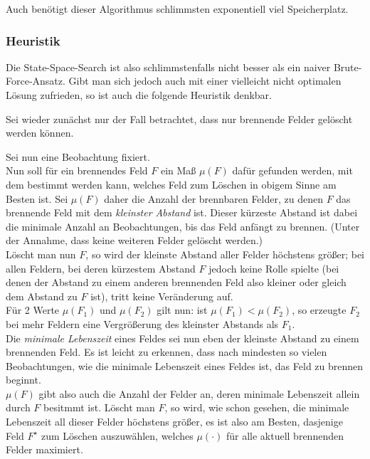Auch benötigt dieser Algorithmus schlimmsten exponentiell viel Speicherplatz.

\subsubsection*{Heuristik}

Die State-Space-Search ist also schlimmstenfalls nicht besser als ein naiver Brute-Force-Ansatz. Gibt man sich jedoch auch mit einer vielleicht nicht optimalen Lösung zufrieden, so ist auch die folgende Heuristik denkbar.

Sei wieder zunächst nur der Fall betrachtet, dass nur brennende Felder gelöscht werden können.

Sei nun eine Beobachtung fixiert.\\
Nun soll für ein brennendes Feld $F$ ein Maß $\mu(F)$ dafür gefunden werden, mit dem bestimmt werden kann, welches Feld zum Löschen in obigem Sinne am Besten ist. Sei $\mu(F)$ daher die Anzahl der brennbaren Felder, zu denen $F$ das brennende Feld mit dem \emph{kleinster Abstand} ist. Dieser kürzeste Abstand ist dabei die minimale Anzahl an Beobachtungen, bis das Feld anfängt zu brennen. (Unter der Annahme, dass keine weiteren Felder gelöscht werden.)\\
Löscht man nun $F$, so wird der kleinste Abstand aller Felder höchstens größer; bei allen Feldern, bei deren kürzestem Abstand $F$ jedoch keine Rolle spielte (bei denen der Abstand zu einem anderen brennenden Feld also kleiner oder gleich dem Abstand zu $F$ ist), tritt keine Veränderung auf.\\
Für 2 Werte $\mu(F_1)$ und $\mu(F_2)$ gilt nun: ist $\mu(F_1) < \mu(F_2)$, so erzeugte $F_2$ bei mehr Feldern eine Vergrößerung des kleinster Abstands als $F_1$.\\
Die \emph{minimale Lebenszeit} eines Feldes sei nun eben der kleinste Abstand zu einem brennenden Feld. Es ist leicht zu erkennen, dass nach mindesten so vielen Beobachtungen, wie die minimale Lebenszeit eines Feldes ist, das Feld zu brennen beginnt.\\
$\mu(F)$ gibt also auch die Anzahl der Felder an, deren minimale Lebenszeit allein durch $F$ besitmmt ist. Löscht man $F$, so wird, wie schon gesehen, die minimale Lebenszeit all dieser Felder höchstens größer, es ist also am Besten, dasjenige Feld $F^\star$ zum Löschen auszuwählen, welches $\mu(\cdot)$ für alle aktuell brennenden Felder maximiert.

